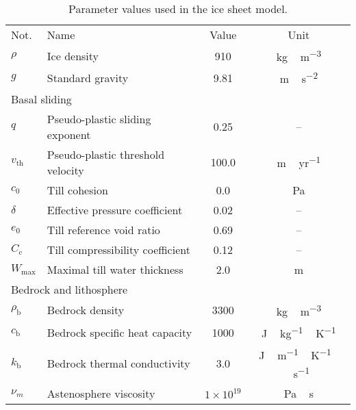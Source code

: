 \documentclass[tc, manuscript]{copernicus}
\begin{document}
\begin{table}[t]
\caption{Parameter values used in the ice sheet model.}
{\begin{tabular}{llcc}
    \tophline
    Not.    & Name & Value & Unit \\
    \middlehline
    $\rho$  & Ice density
            & 910
            & \unit{kg\,m^{-3}} \\

    $g$     & Standard gravity
            & 9.81
            & \unit{m\,s^{-2}} \\
    \cline{1-4}
    \multicolumn{2}{l}{{Basal sliding}} \\
    \cline{1-4}
    $q$     & Pseudo-plastic sliding exponent
            & 0.25
            & -- \\

    $v_{\text{th}}$& Pseudo-plastic threshold velocity
            & 100.0
            & \unit{m\,yr^{-1}} \\

    $c_0$   & Till cohesion
            & 0.0
            & Pa \\

    $\delta$& Effective pressure coefficient
            & 0.02
            & -- \\

    $e_0$   & Till reference void ratio
            & 0.69
            & -- \\

    $C_{\mathrm{c}}$   & Till compressibility coefficient
            & 0.12
            & -- \\

    $W_{\text{max}}$ & Maximal till water thickness
            & 2.0
            & m \\
    \cline{1-4}
    \multicolumn{2}{l}{{Bedrock and lithosphere}} \\
    \cline{1-4}
    $\rho_{\mathrm{b}}$& Bedrock density
            & 3300
            & \unit{kg\,m^{-3}} \\

    $c_{\mathrm{b}}$   & Bedrock specific heat capacity
            & 1000
            & \unit{J\,kg^{-1}\,K^{-1}} \\

    $k_{\mathrm{b}}$   & Bedrock thermal conductivity
            & 3.0
            & \unit{J\,m^{-1}\,K^{-1}\,s^{-1}} \\

    $\nu_m$ & Astenosphere viscosity
            & $1\times10^{19}$
            & \unit{Pa\,s} \\


\end{tabular}}
\end{table}
\end{document}
